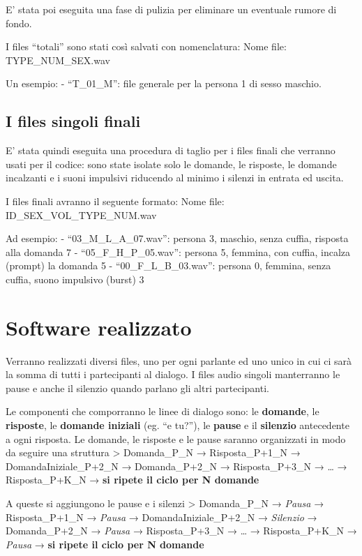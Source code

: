 \documentclass[
]{article}
\begin{document}
E' stata poi eseguita una fase di pulizia per eliminare un eventuale rumore di fondo.

I files ``totali'' sono stati così salvati con nomenclatura: Nome file: TYPE\_NUM\_SEX.wav

Un esempio: - ``T\_01\_M'': file generale per la persona 1 di sesso maschio.

\subsection{I files singoli finali}\label{i-files-singoli-finali}

E' stata quindi eseguita una procedura di taglio per i files finali che verranno usati per il codice: sono state isolate solo le domande, le risposte, le domande incalzanti e i suoni impulsivi riducendo al minimo i silenzi in entrata ed uscita.

I files finali avranno il seguente formato: Nome file: ID\_SEX\_VOL\_TYPE\_NUM.wav

Ad esempio: - ``03\_M\_L\_A\_07.wav'': persona 3, maschio, senza cuffia, risposta alla domanda 7 - ``05\_F\_H\_P\_05.wav'': persona 5, femmina, con cuffia, incalza (prompt) la domanda 5 - ``00\_F\_L\_B\_03.wav'': persona 0, femmina, senza cuffia, suono impulsivo (burst) 3

\section{Software realizzato}\label{software-realizzato}

Verranno realizzati diversi files, uno per ogni parlante ed uno unico in cui ci sarà la somma di tutti i partecipanti al dialogo. I files audio singoli manterranno le pause e anche il silenzio quando parlano gli altri partecipanti.

Le componenti che comporranno le linee di dialogo sono: le \textbf{domande}, le \textbf{risposte}, le \textbf{domande iniziali} (eg. ``e tu?''), le \textbf{pause} e il \textbf{silenzio} antecedente a ogni risposta. Le domande, le risposte e le pause saranno organizzati in modo da seguire una struttura \textgreater{} Domanda\_P\_N → Risposta\_P+1\_N → DomandaIniziale\_P+2\_N → Domanda\_P+2\_N → Risposta\_P+3\_N → \ldots{} → Risposta\_P+K\_N → \textbf{si ripete il ciclo per N domande}

A queste si aggiungono le pause e i silenzi \textgreater{} Domanda\_P\_N → \emph{Pausa} → Risposta\_P+1\_N → \emph{Pausa} → DomandaIniziale\_P+2\_N → \emph{Silenzio} → Domanda\_P+2\_N → \emph{Pausa} → Risposta\_P+3\_N → \ldots{} → Risposta\_P+K\_N → \emph{Pausa} → \textbf{si ripete il ciclo per N domande}
\end{document}
